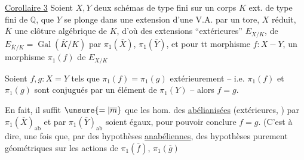 \uline{Corollaire 3} Soient  $X,Y$ deux schémas de type fini sur un corps $K$ ext. de type fini de $\mathbb Q$,   que $Y$ se plonge dans une  extension d'une V.A. par un tore, $X$ réduit,   $\overline K$ une clôture algébrique de $K$, d'où des extensions ``extérieures'' $E_{X/K}$,  de $E_{\overline K/K}=\operatorname{Gal}(\overline K/K)$ par $\pi_1(\overline X)$, $\pi_1(\overline Y)$, et pour tt morphisme $f:X-Y$, un morphisme $\pi_1(f)$ de $E_{X/K}$ 

Soient $f,g:X=Y$ tels que $\pi_1(f)=\pi_1(g)$ extérieurement -- i.e. $\pi_1(f)$ et $\pi_1(g)$ sont conjugués par un élément de $\pi_1(Y)$ -- alors $f=g$.

En fait, il suffit $\unsure{=|\overline m}$ que les hom. des \uline{abélianisées} (extérieures, ) par $\pi_1(\overline X)_{\mathrm{ab}}$ et par $\pi_1(\overline Y)_{\mathrm{ab}}$ soient égaux, pour pouvoir conclure $f=g$. (C'est à dire, une fois que,  par des hypothèses \uline{anabéliennes}, des hypothèses purement géométriques sur les actions de $\pi_1(\overline f)$, $\pi_1(\overline g)$ 
